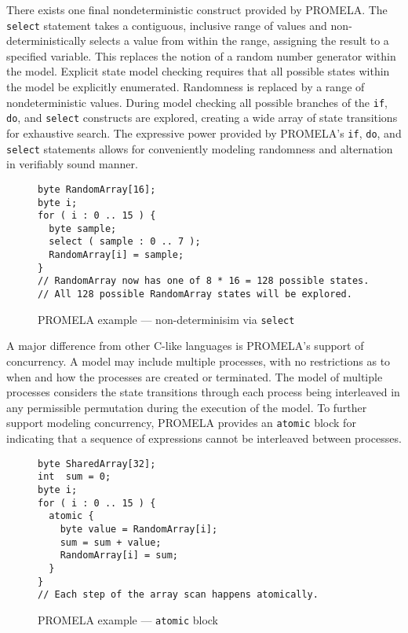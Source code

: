 There exists one final nondeterministic construct provided by PROMELA.
The \texttt{select} statement takes a contiguous, inclusive range of values and non-deterministically selects a value from within the range, assigning the result to a specified variable.
This replaces the notion of a random number generator within the model.
Explicit state model checking requires that all possible states within the model be explicitly enumerated.
Randomness is replaced by a range of nondeterministic values.
During model checking all possible branches of the \texttt{if}, \texttt{do}, and \texttt{select} constructs are explored, creating a wide array of state transitions for exhaustive search.
The expressive power provided by PROMELA's \texttt{if}, \texttt{do}, and \texttt{select} statements allows for conveniently modeling randomness and alternation in verifiably sound manner.

\begin{figure}
\centering
\caption{PROMELA example --- non-determinisim via \texttt{select}}
\begin{verbatim}
byte RandomArray[16];
byte i;
for ( i : 0 .. 15 ) {
  byte sample;
  select ( sample : 0 .. 7 );
  RandomArray[i] = sample;
}
// RandomArray now has one of 8 * 16 = 128 possible states.
// All 128 possible RandomArray states will be explored.
\end{verbatim}
\end{figure}

A major difference from other C-like languages is PROMELA's support of concurrency.
A model may include multiple processes, with no restrictions as to when and how the processes are created or terminated.
The model of multiple processes considers the state transitions through each process being interleaved in any permissible permutation during the execution of the model.
To further support modeling concurrency, PROMELA provides an \texttt{atomic} block for indicating that a sequence of expressions cannot be interleaved between processes.

\begin{figure}
\centering
\caption{PROMELA example --- \texttt{atomic} block}
\begin{verbatim}
byte SharedArray[32];
int  sum = 0; 
byte i;
for ( i : 0 .. 15 ) {
  atomic {
    byte value = RandomArray[i];
    sum = sum + value;
    RandomArray[i] = sum;
  }
}
// Each step of the array scan happens atomically.
\end{verbatim}
\end{figure}


